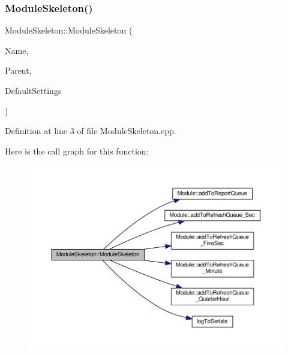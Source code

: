 \subsubsection{\texorpdfstring{Module\+Skeleton()}{ModuleSkeleton()}\hspace{0.1cm}{\footnotesize\ttfamily [1/2]}}
{\footnotesize\ttfamily Module\+Skeleton\+::\+Module\+Skeleton (\begin{DoxyParamCaption}\item[{const \+\_\+\+\_\+\+Flash\+String\+Helper $\ast$}]{Name,  }\item[{\hyperlink{class_module}{Module} $\ast$}]{Parent,  }\item[{\hyperlink{struct_settings_1_1_module_skeleton_settings}{Settings\+::\+Module\+Skeleton\+Settings} $\ast$}]{Default\+Settings }\end{DoxyParamCaption})}



Definition at line 3 of file Module\+Skeleton.\+cpp.

Here is the call graph for this function\+:
\nopagebreak
\begin{figure}[H]
\begin{center}
\leavevmode
\includegraphics[width=350pt]{class_module_skeleton_a28db770cfd6d6a02110d0adb62666676_cgraph}
\end{center}
\end{figure}
\mbox{\label{class_module_skeleton_a28db770cfd6d6a02110d0adb62666676}} 
